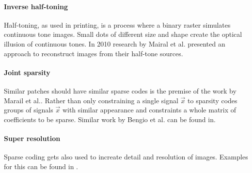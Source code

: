 \paragraph{Inverse half-toning} Half-toning, as used in printing, is a process
where a binary raster simulates continuous tone images. Small dots of different
size and shape create the optical illusion of continuous tones. In 2010 research
by Mairal et al.\cite{Mairal2010b} presented an approach to reconstruct images
from their half-tone sources.

\paragraph{Joint sparsity} Similar patches should have similar sparse
codes is the premise of the work by Marail et al.\cite{Mairal2009c}. Rather
than only constraining a single signal $\vec{x}$ to sparsity codes groups of
signals $\vec{x}$ with similar appearance and constraints a whole matrix of
coefficients to be sparse. Similar work by Bengio et
al. can be found in\cite{Bengio2009}.

\paragraph{Super resolution} Sparse coding gets also used to increate detail and
resolution of images. Examples for this can be found in
\cite{Wright2008,Yang2010,Yang2010}.







